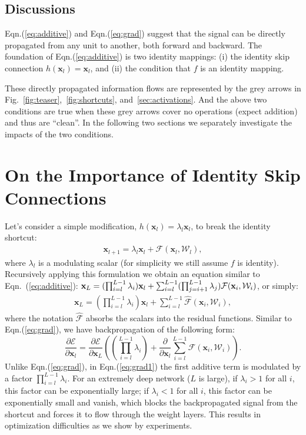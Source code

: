 \documentclass[runningheads]{llncs}
\newcommand{\ve}[1]{\mathbf{#1}} \newcommand{\ma}[1]{\mathrm{#1}}
\newcommand{\fp}[2]{\frac{\partial{#1}}{\partial{#2}}} \newcommand{\dvp}[2]{\frac{\partial}{\partial{#2}}#1}
\begin{document}
\subsection*{Discussions}

Eqn.(\ref{eq:additive}) and Eqn.(\ref{eq:grad}) suggest that the signal can be directly propagated from any unit to another, both forward and backward.
The foundation of Eqn.(\ref{eq:additive}) is two identity mappings: (i) the identity skip connection $h(\ve{x}_{l}) = \ve{x}_{l}$, and (ii) the condition that $f$ is an identity mapping.

These directly propagated information flows are represented by the grey arrows in Fig.~\ref{fig:teaser},~\ref{fig:shortcuts}, and~\ref{sec:activations}. And the above two conditions are true when these grey arrows cover no operations (expect addition) and thus are ``clean''.
In the following two sections we separately investigate the impacts of the two conditions.


\section{On the Importance of Identity Skip Connections}
\label{sec:identityskip}

Let's consider a simple modification, $h(\ve{x}_{l}) = \lambda_l\ve{x}_{l}$, to break the identity shortcut:
\begin{eqnarray}
\ve{x}_{l+1} = \lambda_l\ve{x}_{l} + \mathcal{F}(\ve{x}_{l}, \mathcal{W}_{l}),
\end{eqnarray}
where $\lambda_l$ is a modulating scalar (for simplicity we still assume $f$ is identity). Recursively applying this formulation we obtain an equation similar to Eqn.~(\ref{eq:additive}): $\ve{x}_{L} =  (\prod_{i=l}^{L-1}\lambda_{i})\ve{x}_{l} + \sum_{i=l}^{L-1} (\prod_{j=i+1}^{L-1}\lambda_{\tiny j}) \mathcal{F}(\ve{x}_{i}, \mathcal{W}_{i})$, or simply:
\begin{eqnarray}
\ve{x}_{L} = (\prod_{i=l}^{L-1}\lambda_{i})\ve{x}_{l} + \sum_{i=l}^{L-1}\mathcal{\hat{F}}(\ve{x}_{i}, \mathcal{W}_{i}),
\label{eq:additive1}
\end{eqnarray}
where the notation $\mathcal{\hat{F}}$ absorbs the scalars into the residual functions.
Similar to Eqn.(\ref{eq:grad}), we have backpropagation of the following form:
\begin{equation}
\fp{\mathcal{E}}{\ve{x}_{l}}=\fp{\mathcal{E}}{\ve{x}_{L}}\left((\prod_{i=l}^{L-1}\lambda_{i})+\dvp{\sum_{i=l}^{L-1}\mathcal{\hat{F}}(\ve{x}_{i}, \mathcal{W}_{i})}{\ve{x}_{l}}\right).\label{eq:grad1}
\end{equation}
Unlike Eqn.(\ref{eq:grad}), in Eqn.(\ref{eq:grad1}) the first additive term is modulated by a factor $\prod_{i=l}^{L-1}\lambda_{i}$. For an extremely deep network ($L$ is large), if $\lambda_{i}>1$ for all $i$, this factor can be exponentially large; if $\lambda_{i}<1$ for all $i$, this factor can be exponentially small and vanish, which blocks the backpropagated signal from the shortcut and forces it to flow through the weight layers. This results in optimization difficulties as we show by experiments.
\end{document}

